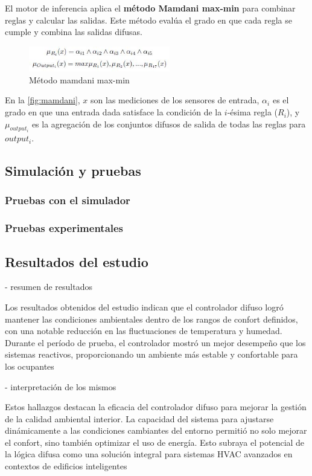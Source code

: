 El motor de inferencia aplica el \textbf{método Mamdani max-min} para combinar reglas y calcular las salidas. Este método evalúa el grado en que cada regla se cumple y combina las salidas difusas.

\begin{figure}[H]
	\centering
	\includegraphics[width=0.55\textwidth]{imgs/mamdani.JPG}
	\caption{Método mamdani max-min}
	\label{fig:mamdani}
\end{figure}

En la \autoref{fig:mamdani}, $x$ son las mediciones de los sensores de entrada, $\alpha_i$ es el grado en que una entrada dada satisface la condición de la $i$-ésima regla ($R_i$), y $\mu_{output_i}$ es la agregación de los conjuntos difusos de salida de todas las reglas para $output_i$.

\subsection{Simulación y pruebas}

\subsubsection{Pruebas con el simulador}

\subsubsection{Pruebas experimentales}

\subsection{Resultados del estudio}
- resumen de resultados

Los resultados obtenidos del estudio indican que el controlador difuso logró mantener las condiciones ambientales dentro de los rangos de confort definidos, con una notable reducción en las fluctuaciones de temperatura y humedad. Durante el período de prueba, el controlador mostró un mejor desempeño que los sistemas reactivos, proporcionando un ambiente más estable y confortable para los ocupantes

- interpretación de los mismos

Estos hallazgos destacan la eficacia del controlador difuso para mejorar la gestión de la calidad ambiental interior. La capacidad del sistema para ajustarse dinámicamente a las condiciones cambiantes del entorno permitió no solo mejorar el confort, sino también optimizar el uso de energía. Esto subraya el potencial de la lógica difusa como una solución integral para sistemas HVAC avanzados en contextos de edificios inteligentes


